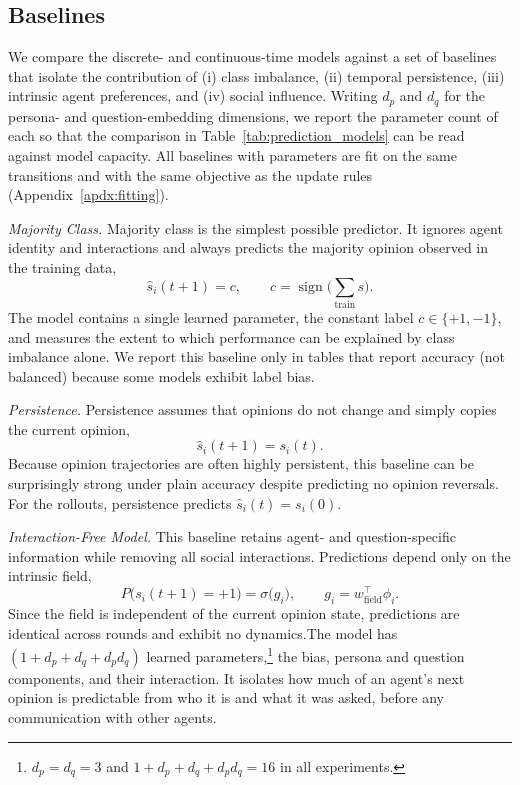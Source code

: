 \subsection{Baselines}\label{apdx:baselines}

We compare the discrete- and continuous-time models against a set of baselines that isolate
the contribution of (i) class imbalance, (ii) temporal persistence, (iii) intrinsic agent
preferences, and (iv) social influence. Writing $d_p$ and $d_q$ for the persona- and
question-embedding dimensions, we report the parameter count of each so that the comparison in
Table~\ref{tab:prediction_models} can be read against model capacity. All baselines with
parameters are fit on the same transitions and with the same objective as the update rules
(Appendix~\ref{apdx:fitting}).

\textit{Majority Class.} Majority class is the simplest possible predictor. It ignores agent identity and interactions and always predicts the majority opinion observed in the training data,
\[
\hat{s}_i(t{+}1)=c,
\qquad
c=\operatorname{sign}\!\Big(\textstyle\sum_{\text{train}} s\Big).
\]
The model contains a single learned parameter, the constant label $c\in\{+1,-1\}$, and measures
the extent to which performance can be explained by class imbalance alone. We report this baseline only in tables that report accuracy (not balanced) because some models exhibit label bias.

\textit{Persistence.} Persistence assumes that opinions do not change and simply copies the
current opinion,
\[
\hat{s}_i(t{+}1)=s_i(t).
\]
Because opinion trajectories are often highly persistent, this baseline can be surprisingly
strong under plain accuracy despite predicting no opinion reversals. For the rollouts, persistence predicts $\hat{s}_i(t)=s_i(0)$.


\textit{Interaction-Free Model.} This baseline retains agent- and question-specific information while removing all social interactions. Predictions depend only on the intrinsic field,
\[
P\big(s_i(t{+}1)=+1\big)
=
\sigma\!\big(g_i\big),
\qquad
g_i={w}_{\text{field}}^{\top}{\phi}_i .
\]
Since the field is independent of the current opinion state, predictions are identical across
rounds and exhibit no dynamics.The model has
$(1+d_p+d_q+d_p d_q)$ learned parameters,\footnote{$d_p = d_q = 3$ and $1+d_p+d_q+d_p d_q = 16$ in all experiments.} the bias, persona and question components,
and their interaction. It isolates how much of an agent's next opinion is predictable
from who it is and what it was asked, before any communication with other agents.


